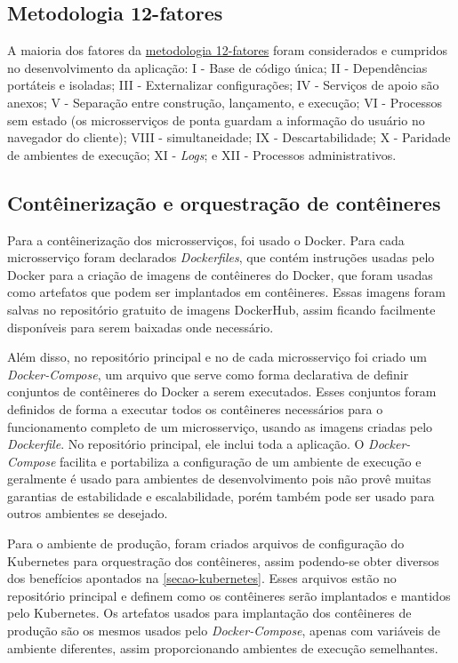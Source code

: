\subsection{Metodologia 12-fatores}
A maioria dos fatores da \hyperref[metodologia-12-fatores]{metodologia 12-fatores} foram considerados e cumpridos no desenvolvimento da aplicação: I - Base de código única; II - Dependências portáteis e isoladas; III - Externalizar configurações; IV - Serviços de apoio são anexos; V - Separação entre construção, lançamento, e execução; VI - Processos sem estado (os microsserviços de ponta guardam a informação do usuário no navegador do cliente); VIII - simultaneidade; IX - Descartabilidade; X - Paridade de ambientes de execução; XI - \emph{Logs}; e XII - Processos administrativos.

\subsection{Contêinerização e orquestração de contêineres}
Para a contêinerização dos microsserviços, foi usado o Docker. Para cada microsserviço foram declarados \emph{Dockerfiles}, que contém instruções usadas pelo Docker para a criação de imagens de contêineres do Docker, que foram usadas como artefatos que podem ser implantados em contêineres. Essas imagens foram salvas no repositório gratuito de imagens DockerHub, assim ficando facilmente disponíveis para serem baixadas onde necessário.

Além disso, no repositório principal e no de cada microsserviço foi criado um \emph{Docker-Compose}, um arquivo que serve como forma declarativa de definir conjuntos de contêineres do Docker a serem executados. Esses conjuntos foram definidos de forma a executar todos os contêineres necessários para o funcionamento completo de um microsserviço, usando as imagens criadas pelo \emph{Dockerfile}. No repositório principal, ele inclui toda a aplicação. O \emph{Docker-Compose} facilita e portabiliza a configuração de um ambiente de execução e geralmente é usado para ambientes de desenvolvimento pois não provê muitas garantias de estabilidade e escalabilidade, porém também pode ser usado para outros ambientes se desejado.

Para o ambiente de produção, foram criados arquivos de configuração do Kubernetes para orquestração dos contêineres, assim podendo-se obter diversos dos benefícios apontados na \autoref{secao-kubernetes}. Esses arquivos estão no repositório principal e definem como os contêineres serão implantados e mantidos pelo Kubernetes. Os artefatos usados para implantação dos contêineres de produção são os mesmos usados pelo \emph{Docker-Compose}, apenas com variáveis de ambiente diferentes, assim proporcionando ambientes de execução semelhantes.

